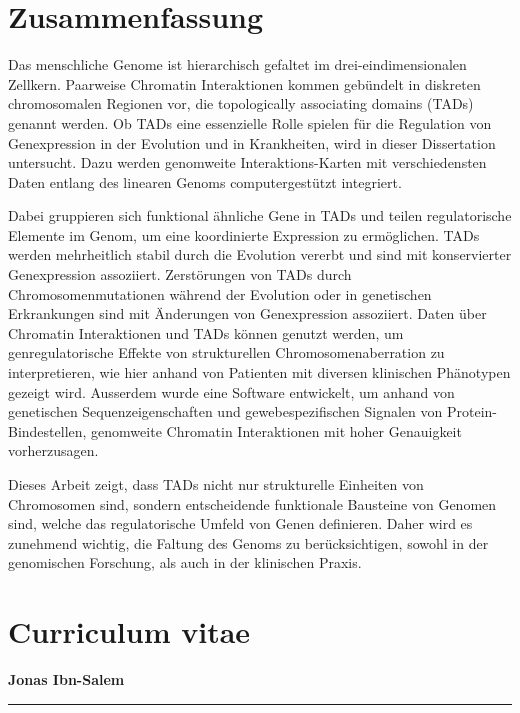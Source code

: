 \documentclass[a4paper,twoside=true,openright,parskip=full,chapterprefix=true,11pt,headings=normal,bibliography=totoc,listof=totoc,titlepage=on,captions=tableabove,draft=false]{scrreprt}
\theoremstyle{definition}
\theoremstyle{definition}
\theoremstyle{definition}
\theoremstyle{remark}
\begin{document}
\hypertarget{zusammenfassung}{%
\chapter*{Zusammenfassung}\label{zusammenfassung}}

Das menschliche Genome ist hierarchisch gefaltet im
drei-eindimensionalen Zellkern. Paarweise Chromatin Interaktionen kommen
gebündelt in diskreten chromosomalen Regionen vor, die topologically
associating domains (TADs) genannt werden. Ob TADs eine essenzielle
Rolle spielen für die Regulation von Genexpression in der Evolution und
in Krankheiten, wird in dieser Dissertation untersucht. Dazu werden
genomweite Interaktions-Karten mit verschiedensten Daten entlang des
linearen Genoms computergestützt integriert.

Dabei gruppieren sich funktional ähnliche Gene in TADs und teilen
regulatorische Elemente im Genom, um eine koordinierte Expression zu
ermöglichen. TADs werden mehrheitlich stabil durch die Evolution vererbt
und sind mit konservierter Genexpression assoziiert. Zerstörungen von
TADs durch Chromosomenmutationen während der Evolution oder in
genetischen Erkrankungen sind mit Änderungen von Genexpression
assoziiert. Daten über Chromatin Interaktionen und TADs können genutzt
werden, um genregulatorische Effekte von strukturellen
Chromosomenaberration zu interpretieren, wie hier anhand von Patienten
mit diversen klinischen Phänotypen gezeigt wird. Ausserdem wurde eine
Software entwickelt, um anhand von genetischen Sequenzeigenschaften und
gewebespezifischen Signalen von Protein-Bindestellen, genomweite
Chromatin Interaktionen mit hoher Genauigkeit vorherzusagen.

Dieses Arbeit zeigt, dass TADs nicht nur strukturelle Einheiten von
Chromosomen sind, sondern entscheidende funktionale Bausteine von
Genomen sind, welche das regulatorische Umfeld von Genen definieren.
Daher wird es zunehmend wichtig, die Faltung des Genoms zu
berücksichtigen, sowohl in der genomischen Forschung, als auch in der
klinischen Praxis.

\hypertarget{curriculum-vitae}{%
\chapter*{Curriculum vitae}\label{curriculum-vitae}}

\textbf{Jonas Ibn-Salem}

\begin{center}\rule{0.5\linewidth}{\linethickness}\end{center}
\end{document}
